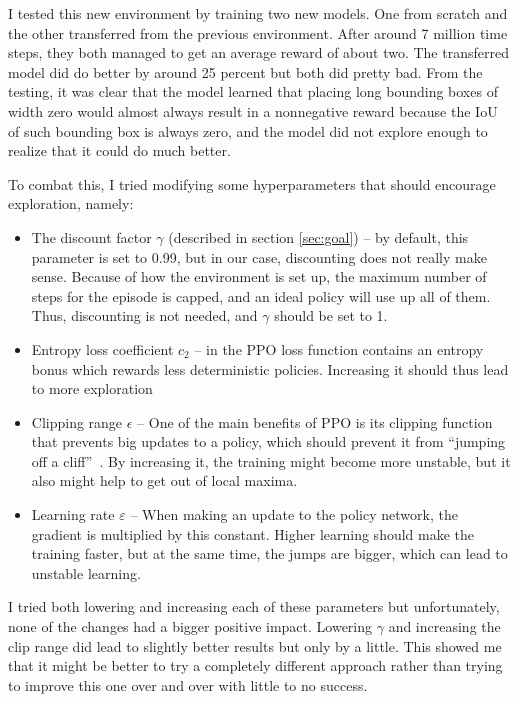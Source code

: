 \documentclass[
  digital,     %
  oneside,     %
  nosansbold,  %
  nocolorbold, %
  lof,         %
  lot,         %
]{fithesis4}
\begin{document}
I tested this new environment by training two new models. One from scratch and the other transferred from the previous environment. After around 7 million time steps, they both managed to get an average reward of about two. The transferred model did do better by around 25 percent but both did pretty bad. From the testing, it was clear that the model learned that placing long bounding boxes of width zero would almost always result in a nonnegative reward because the IoU of such bounding box is always zero, and the model did not explore enough to realize that it could do much better.

To combat this, I tried modifying some hyperparameters that should encourage exploration, namely:
\begin{itemize}
    \item The discount factor $\gamma$ (described in section \ref{sec:goal}) -- by default, this parameter is set to 0.99, but in our case, discounting does not really make sense. Because of how the environment is set up, the maximum number of steps for the episode is capped, and an ideal policy will use up all of them. Thus, discounting is not needed, and $\gamma$ should be set to 1.
    \item Entropy loss coefficient $c_2$ -- in the PPO loss function contains an entropy bonus which rewards less deterministic policies. Increasing it should thus lead to more exploration~\cite{PPO_paper}
    \item Clipping range $\epsilon$ -- One of the main benefits of PPO is its clipping function that prevents big updates to a policy, which should prevent it from \enquote{jumping off a cliff}~\cite{PPO_paper}. By increasing it, the training might become more unstable, but it also might help to get out of local maxima.
    \item Learning rate $\varepsilon$ -- When making an update to the policy network, the gradient is multiplied by this constant. Higher learning should make the training faster, but at the same time, the jumps are bigger, which can lead to unstable learning.
\end{itemize}

I tried both lowering and increasing each of these parameters but unfortunately, none of the changes had a bigger positive impact. Lowering $\gamma$ and increasing the clip range did lead to slightly better results but only by a little. This showed me that it might be better to try a completely different approach rather than trying to improve this one over and over with little to no success.
\end{document}
